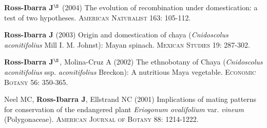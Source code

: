 \documentclass[letterpaper]{article}
\renewenvironment{itemize}{
  \begin{list}{}{
    \setlength{\leftmargin}{1.5em}
  }
}{
  \end{list}
}
\begin{document}
\begin{etaremune}
\item {\bf Ross-Ibarra J}$^\S$ (2004) The evolution of recombination under domestication: a test of two hypotheses.  \textsc{American Naturalist} 163: 105-112.
\\%

\item {\bf Ross-Ibarra J} (2003) Origin and domestication of chaya (\emph{Cnidoscolus aconitifolius} Mill I. M. Johnst): Mayan spinach.  \textsc{Mexican Studies} 19: 287-302.
\\%

\item {\bf Ross-Ibarra J}$^\S$, Molina-Cruz A (2002) The ethnobotany of Chaya (\emph{Cnidoscolus aconitifolius} ssp. \emph{aconitifolius} Breckon): A nutritious Maya vegetable.  \textsc{Economic Botany} 56: 350-365.
\\%

\item  Neel MC, {\bf Ross-Ibarra J}, Ellstrand NC (2001) Implications of mating patterns for conservation of the endangered plant \emph{Eriogonum ovalifolium} var. \emph{vineum} (Polygonaceae).  \textsc{American Journal of Botany} 88: 1214-1222.
\\%
\end{etaremune}


\end{document}
